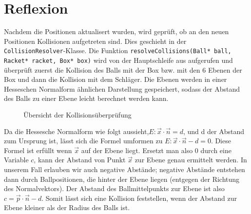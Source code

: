 \section{Reflexion}
\label{Kapitel_4_-_Unterkapitel_2}

Nachdem die Positionen aktualisert wurden, wird geprüft, ob an den neuen Positionen Kollisionen aufgetreten sind. Dies geschieht in der {\texttt{CollisionResolver}}-Klasse. Die Funktion {\texttt{resolveCollisions(Ball* ball, Racket* racket, Box* box)}} wird von der Hauptschleife aus aufgerufen und überprüft zuerst die Kollision des Balls mit der Box bzw. mit den 6 Ebenen der Box und dann die Kollision mit dem Schläger.
Die Ebenen werden in einer Hesseschen Normalform ähnlichen Darstellung gespeichert, sodass der Abstand des Balls zu einer Ebene leicht berechnet werden kann.

\begin{figure}[h]
    \caption{Übersicht der Kollisionsüberprüfung}
        \label{fig_testbild}
\end{figure} 

Da die Hessesche Normalform wie folgt aussieht,$ E: \vec x \cdot \vec n  = d $, und d der Abstand zum Ursprung ist, lässt sich die Formel umformen zu $ E: \vec x \cdot \vec n  - d = 0$. Diese Formel ist erfüllt wenn $\vec x$ auf der Ebene liegt. Ersetzt man also 0 durch eine Variable $c$, kann der Abstand von Punkt $\vec x$ zur Ebene genau ermittelt werden. In unserem Fall erlauben wir auch negative Abstände; negative Abstände entstehen dann durch Ballpositionen, die hinter der Ebene liegen (entgegen der Richtung des Normalvektors).
Der Abstand des Ballmittelpunkts zur Ebene ist also $c = \vec p\cdot \vec n - d $. Somit lässt sich eine Kollision feststellen, wenn der Abstand zur Ebene kleiner als der Radius des Balls ist.

